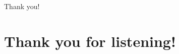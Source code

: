 \documentclass{beamer}
\begin{document}
\begin{frame}{Thank you!}
\section{Thank you for listening!}
\end{frame}
\end{document}

